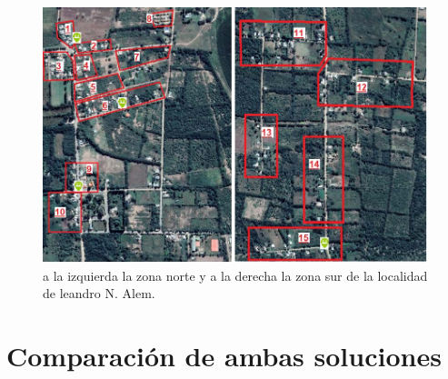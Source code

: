 \documentclass[11pt,a4paper]{article}
\begin{document}
\begin{figure}[htbp]
  \centering
  \includegraphics[width=0.8\linewidth]{fotos_ema/cuadrantes_alem.jpg}
  \caption{a la izquierda la zona norte y a la derecha la zona sur de la localidad de leandro N. Alem.}
  \label{fig:cuadrantes_alem_fo}
\end{figure}



\part{Comparación de ambas soluciones}
\end{document}
